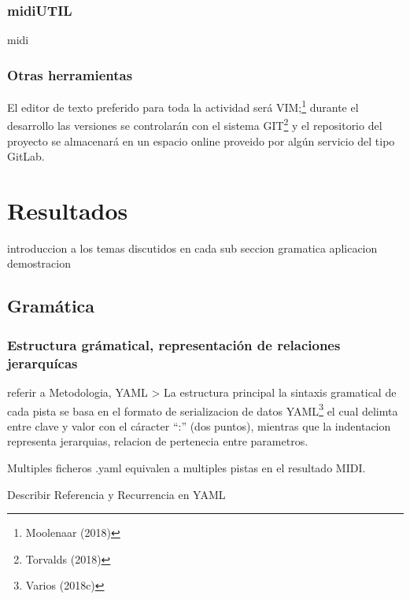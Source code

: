\documentclass[]{article}
\begin{document}
\hypertarget{midiutil}{%
\subsubsection{midiUTIL}\label{midiutil}}

midi

\hypertarget{otras-herramientas}{%
\subsubsection{Otras herramientas}\label{otras-herramientas}}

El editor de texto preferido para toda la actividad será VIM;\footnote{Moolenaar
  (2018)} durante el desarrollo las versiones se controlarán con el
sistema GIT\footnote{Torvalds (2018)} y el repositorio del proyecto se
almacenará en un espacio online proveido por algún servicio del tipo
GitLab.

\hypertarget{resultados}{%
\section{Resultados}\label{resultados}}

introduccion a los temas discutidos en cada sub seccion gramatica
aplicacion demostracion

\hypertarget{gramuxe1tica}{%
\subsection{Gramática}\label{gramuxe1tica}}

\hypertarget{estructura-gruxe1matical-representaciuxf3n-de-relaciones-jerarquuxedcas}{%
\subsubsection{Estructura grámatical, representación de relaciones
jerarquícas}\label{estructura-gruxe1matical-representaciuxf3n-de-relaciones-jerarquuxedcas}}

referir a Metodologia, YAML \textgreater{} La estructura principal la
sintaxis gramatical de cada pista se basa en el formato de serializacion
de datos YAML\footnote{Varios (2018c)} el cual delimta entre clave y
valor con el cáracter ``:'' (dos puntos), mientras que la indentacion
representa jerarquias, relacion de pertenecia entre parametros.

Multiples ficheros .yaml equivalen a multiples pistas en el resultado
MIDI.

Describir Referencia y Recurrencia en YAML
\end{document}
